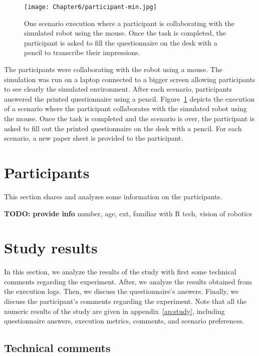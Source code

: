 \begin{figure}
    \center
    \texttt{[image: Chapter6/participant-min.jpg]}
    \caption{One scenario execution where a participant is collaborating with the simulated robot using the mouse. Once the task is completed, the participant is asked to fill the questionnaire on the desk with a pencil to transcribe their impressions.}
    \label{fig:participant}
\end{figure}

The participants were collaborating with the robot using a mouse. The simulation was run on a laptop connected to a bigger screen allowing participants to see clearly the simulated environment. After each scenario, participants answered the printed questionnaire using a pencil. Figure~\ref{fig:participant} depicts the execution of a scenario where the participant collaborates with the simulated robot using the mouse. Once the task is completed and the scenario is over, the participant is asked to fill out the printed questionnaire on the desk with a pencil. For each scenario, a new paper sheet is provided to the participant. 

\section{Participants}

This section shares and analyzes some information on the participants.

\textbf{TODO: provide info} number, age, ext, familiar with R tech, vision of robotics

\section{Study results}

In this section, we analyze the results of the study with first some technical comments regarding the experiment. After, we analyze the results obtained from the execution logs. Then, we discuss the questionnaire's answers. Finally, we discuss the participant's comments regarding the experiment. Note that all the numeric results of the study are given in appendix~\ref{ap:study}, including questionnaire answers, execution metrics, comments, and scenario preferences. 

\subsection{Technical comments}

